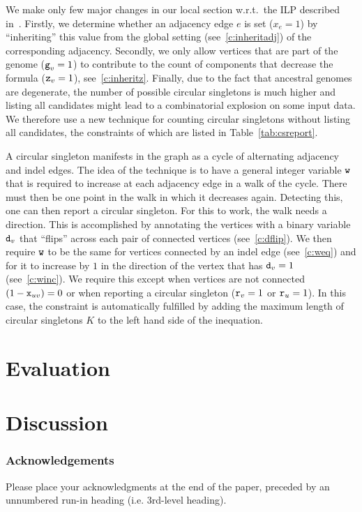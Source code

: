 \documentclass[runningheads]{llncs}
\begin{document}
We make only few major changes in our local section w.r.t.\ the ILP described in~\cite{BOH-2024}. Firstly, we determine whether an adjacency edge $e$ is set ($x_e=1$) by ``inheriting'' this value from the global setting (see~\ref{c:inheritadj}) of the corresponding adjacency. Secondly, we only allow vertices that are part of the genome (${\texttt{g}}_v=1$) to contribute to the count of components that decrease the formula (${\texttt{z}}_v=1$), see~\ref{c:inheritz}.
Finally, due to the fact that ancestral genomes are degenerate, the number of possible circular singletons is much higher and listing all candidates might lead to a combinatorial explosion on some input data. We therefore use a new technique for counting circular singletons without listing all candidates, the constraints of which are listed in Table~\ref{tab:csreport}.

A circular singleton manifests in the graph as a cycle of alternating adjacency and indel edges. The idea of the technique is to have a general integer variable ${\texttt{w}}$ that is required to increase at each adjacency edge in a walk of the cycle. There must then be one point in the walk in which it decreases again. Detecting this, one can then report a circular singleton. For this to work, the walk needs a direction. This is accomplished by annotating the vertices with a binary variable ${\texttt{d}}_v$ that ``flips'' across each pair of connected vertices (see~\ref{c:dflip}). We then require ${\texttt{w}}$ to be the same for vertices connected by an indel edge (see~\ref{c:weq}) and for it to increase by $1$ in the direction of the vertex that has ${\texttt{d}}_v=1$ (see~\ref{c:winc}). We require this except when vertices are not connected $(1-{\texttt{x}}_{uv})=0$ or when reporting a circular singleton (${\texttt{r}}_v=1$ or ${\texttt{r}}_u=1$). In this case, the constraint is automatically fulfilled by adding the maximum length of circular singletons $K$ to the left hand side of the inequation.





\section{Evaluation}
\section{Discussion}



\subsubsection{Acknowledgements} Please place your acknowledgments at
the end of the paper, preceded by an unnumbered run-in heading (i.e.
3rd-level heading).

%
%
%


\end{document}
